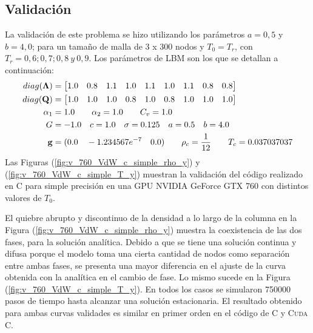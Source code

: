 \subsection{Validación}

La validación de este problema se hizo utilizando los parámetros $a =0,5$ y $b = 4,0$; para un tamaño de malla de 3 x 300 nodos y $T_0 = T_r$, con $T_r = 0,6 ; 0,7 ; 0,8 \> y \> 0,9$.  Los parámetros de LBM son los que se detallan a continuación:
\begin{align*}
\centering
diag(\mathbf{\Lambda}) & = 
\begin{bmatrix}
1.0 & 0.8 & 1.1 & 1.0 & 1.1 & 1.0 & 1.1 & 0.8 & 0.8 \\
\end{bmatrix}\\
diag(\mathbf{Q}) & = 
\begin{bmatrix}
1.0 & 1.0 & 1.0 & 0.8 & 1.0 & 0.8 & 1.0 & 1.0 & 1.0 \\
\end{bmatrix}\\
\alpha_{1} & = 1.0 \qquad 	\alpha_{2} = 1.0 \qquad C_{v} = 1.0\\
G & = -1.0 \quad c = 1.0 \quad \sigma = 0.125 \quad a = 0.5 \quad b = 4.0 \\
\mathbf{g} & = (0.0 \quad-1.234567e^{-7}\quad 0.0 ) \qquad \rho_c = \frac{1}{12} \qquad T_c = 0.037037037
\end{align*}
Las Figuras (\ref{fig:v_760_VdW_c_simple_rho_y}) y (\ref{fig:v_760_VdW_c_simple_T_y})  muestran la validación del código realizado en \textsc{C} para simple precisión en una GPU NVIDIA GeForce GTX 760 con distintos valores de $T_0$. 

El quiebre abrupto y discontinuo de la densidad a lo largo de la columna en la Figura (\ref{fig:v_760_VdW_c_simple_rho_y}) muestra la coexistencia de las dos fases, para la solución analítica. Debido a que se tiene una solución continua y difusa porque el modelo toma una cierta cantidad de nodos como separación entre ambas fases, se presenta una mayor diferencia en el ajuste de la curva obtenida con la analítica en el cambio de fase. Lo mismo sucede en la Figura (\ref{fig:v_760_VdW_c_simple_T_y}). En todos los casos se simularon 750000 pasos de tiempo hasta alcanzar una solución estacionaria. El resultado obtenido para ambas curvas validades es similar en primer orden en el código de \textsc{C} y \textsc{Cuda C}.

